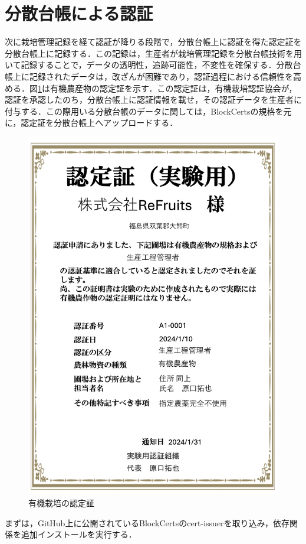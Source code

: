 \documentclass[11pt,dvipdfmx]{jreport}
\begin{document}
\section{分散台帳による認証}
次に栽培管理記録を経て認証が降りる段階で，分散台帳上に認証を得た認定証を分散台帳上に記録する．この記録は，生産者が栽培管理記録を分散台帳技術を用いて記録することで，データの透明性，追跡可能性，不変性を確保する．分散台帳上に記録されたデータは，改ざんが困難であり，認証過程における信頼性を高める．図\ref{fig:ninteisyou}は有機農産物の認定証を示す．この認定証は，有機栽培認証協会が，認証を承認したのち，分散台帳上に認証情報を載せ，その認証データを生産者に付与する．この際用いる分散台帳のデータに関しては，BlockCertsの規格を元に，認定証を分散台帳上へアップロードする．

\begin{figure}[t]
        \centering 
	\includegraphics[width=0.8\linewidth]{Haraguchi_fig/ninnssyou.pdf}
	\caption{有機栽培の認定証}
	\label{fig:ninteisyou}
\end{figure}

まずは，GitHub上に公開されているBlockCertsのcert-issuerを取り込み，依存関係を追加インストールを実行する．
\end{document}
